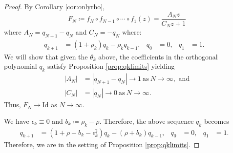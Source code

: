 \documentclass{amsart}
\theoremstyle{remark}
\theoremstyle{definition}
\begin{document}
	\begin{proof}
	By Corollary \ref{cor:onlyrho}, 
		\[F_{N}\coloneqq f_N\circ f_{N-1} \circ \cdots \circ f_1(z) = \frac{A_N z }{C_N z + 1}\] where $A_N = q_{N+1}-q_N$ and  $C_N=-q_N$ where:
\begin{align*}
q_{k+1} &= (1+\rho_k) q_k-\rho_k q_{k-1}, & q_0&=0, & q_1&=1.&
\end{align*}		
We will show that given the $\theta_{k}$ above, the coefficients in the orthogonal polynomial $q_k$ satisfy Proposition \ref{prop:qklimits} yielding 
\begin{align*}
 |A_N| &= |q_{N+1}-q_N| \rightarrow 1 \ \text{as} \ N\rightarrow \infty, \text{ and} \\
 |C_N| &= |q_N| \rightarrow 0 \ \text{as} \ N\rightarrow \infty. 
\end{align*}  
Thus, $F_{N}\rightarrow \text{Id}$ as $N\rightarrow \infty.$

We have $\epsilon_{k} \equiv 0$ and $b_{k}\coloneqq  \rho_{k}-\rho$. Therefore, the above sequence $q_{k}$ becomes
\begin{align*}
    q_{k+1} &= (1+\rho +b_{k}-\epsilon_{k}^2) q_k-(\rho+b_k)q_{k-1}, & q_0&=0, & q_1&=1.&
\end{align*}
Therefore, we are in the setting of Proposition \ref{prop:qklimits}.  


\end{proof}
\end{document}
